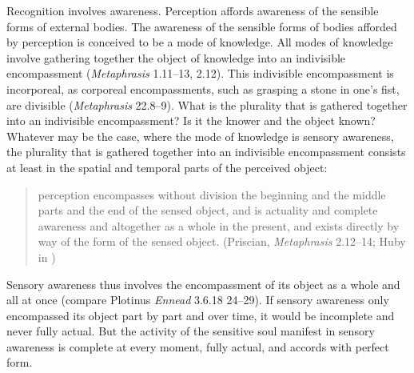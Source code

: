\documentclass[12pt]{article}
\begin{document}
Recognition involves awareness. Perception affords awareness of the sensible forms of external bodies. The awareness of the sensible forms of bodies afforded by perception is conceived to be a mode of knowledge. All modes of knowledge involve gathering together the object of knowledge into an indivisible encompassment (\emph{Metaphrasis} 1.11--13, 2.12). This indivisible encompassment is incorporeal, as corporeal encompassments, such as grasping a stone in one's fist, are divisible (\emph{Metaphrasis} 22.8--9). What is the plurality that is gathered together into an indivisible encompassment? Is it the knower and the object known? Whatever may be the case, where the mode of knowledge is sensory awareness, the plurality that is gathered together into an indivisible encompassment consists at least in the spatial and temporal parts of the perceived object:
\begin{quote}
	perception encompasses without division the beginning and the middle parts and the end of the sensed object, and is actuality and complete awareness and altogether as a whole in the present, and exists directly by way of the form of the sensed object. (Priscian, \emph{Metaphrasis} 2.12--14; Huby in \citealt{Sorabji:1997ly})
\end{quote}
Sensory awareness thus involves the encompassment of its object as a whole and all at once (compare Plotinus \emph{Ennead} 3.6.18 24--29). If sensory awareness only encompassed its object part by part and over time, it would be incomplete and never fully actual. But the activity of the sensitive soul manifest in sensory awareness is complete at every moment, fully actual, and accords with perfect form.


\end{document}

